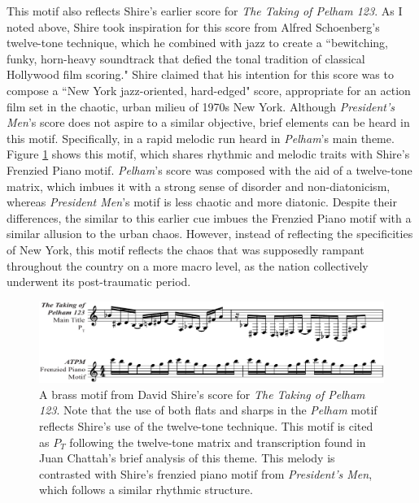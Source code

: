 This motif also reflects Shire's earlier score for \textit{The Taking of Pelham 123}.
As I noted above, Shire took inspiration for this score from Alfred Schoenberg's twelve-tone technique, which he combined with jazz to create a ``bewitching, funky, horn-heavy soundtrack that defied the tonal tradition of classical Hollywood film scoring."\autocites[][30]{chattah_david_2015}
Shire claimed that his intention for this score was to compose a ``New York jazz-oriented, hard-edged" score, appropriate for an action film set in the chaotic, urban milieu of 1970s New York.\autocites[][30]{chattah_david_2015}
Although \textit{President's Men}'s score does not aspire to a similar objective, brief elements can be heard in this motif.
Specifically, in a rapid melodic run heard in \textit{Pelham}'s main theme.
Figure \ref{fig:president-pelham} shows this motif, which shares rhythmic and melodic traits with Shire's Frenzied Piano motif.
\textit{Pelham}'s score was composed with the aid of a twelve-tone matrix, which imbues it with a strong sense of disorder and non-diatonicism, whereas \textit{President Men}'s motif is less chaotic and more diatonic.
Despite their differences, the similar to this earlier cue imbues the Frenzied Piano motif with a similar allusion to the urban chaos.
However, instead of reflecting the specificities of New York, this motif reflects the chaos that was supposedly rampant throughout the country on a more macro level, as the nation collectively underwent its post-traumatic period.

\begin{figure}
    \centering
    \includegraphics[width=1\linewidth]{img/president-pelham.pdf}
    \caption{A brass motif from David Shire's score for \textit{The Taking of Pelham 123}. Note that the use of both flats and sharps in the \textit{Pelham} motif reflects Shire's use of the twelve-tone technique. This motif is cited as $P_T$ following the twelve-tone matrix and transcription found in Juan Chattah's brief analysis of this theme. This melody is contrasted with Shire's frenzied piano motif from \textit{President's Men}, which follows a similar rhythmic structure.}
    \label{fig:president-pelham}
\end{figure}

